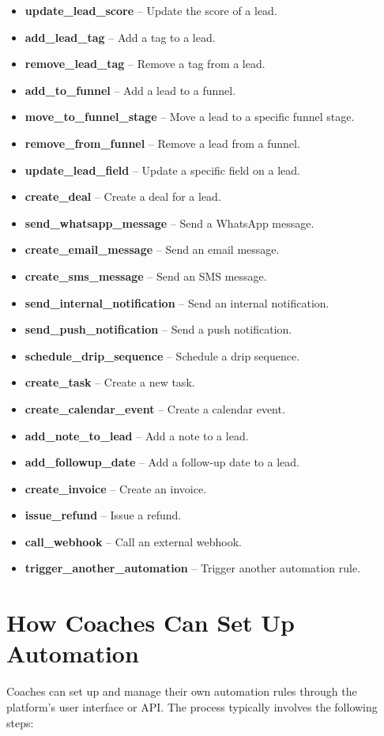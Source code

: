 \documentclass[12pt,a4paper]{article}
\begin{document}
\begin{itemize}[leftmargin=2em]
    \item \textbf{update\_lead\_score} -- Update the score of a lead.
    \item \textbf{add\_lead\_tag} -- Add a tag to a lead.
    \item \textbf{remove\_lead\_tag} -- Remove a tag from a lead.
    \item \textbf{add\_to\_funnel} -- Add a lead to a funnel.
    \item \textbf{move\_to\_funnel\_stage} -- Move a lead to a specific funnel stage.
    \item \textbf{remove\_from\_funnel} -- Remove a lead from a funnel.
    \item \textbf{update\_lead\_field} -- Update a specific field on a lead.
    \item \textbf{create\_deal} -- Create a deal for a lead.
    \item \textbf{send\_whatsapp\_message} -- Send a WhatsApp message.
    \item \textbf{create\_email\_message} -- Send an email message.
    \item \textbf{create\_sms\_message} -- Send an SMS message.
    \item \textbf{send\_internal\_notification} -- Send an internal notification.
    \item \textbf{send\_push\_notification} -- Send a push notification.
    \item \textbf{schedule\_drip\_sequence} -- Schedule a drip sequence.
    \item \textbf{create\_task} -- Create a new task.
    \item \textbf{create\_calendar\_event} -- Create a calendar event.
    \item \textbf{add\_note\_to\_lead} -- Add a note to a lead.
    \item \textbf{add\_followup\_date} -- Add a follow-up date to a lead.
    \item \textbf{create\_invoice} -- Create an invoice.
    \item \textbf{issue\_refund} -- Issue a refund.
    \item \textbf{call\_webhook} -- Call an external webhook.
    \item \textbf{trigger\_another\_automation} -- Trigger another automation rule.
\end{itemize}

\section{How Coaches Can Set Up Automation}
Coaches can set up and manage their own automation rules through the platform’s user interface or API. The process typically involves the following steps:
\end{document}
